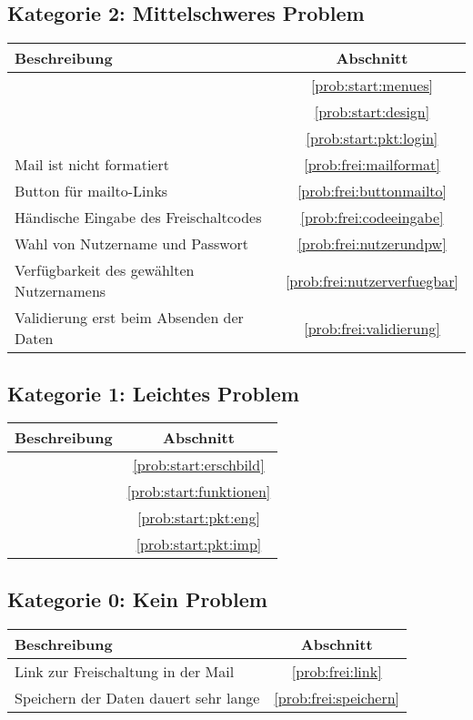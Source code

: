 \subsection*{Kategorie 2: Mittelschweres Problem}
\begin{tabular}{|p{12cm}|c|}
\hline
\textbf{Beschreibung} & \textbf{Abschnitt} \\
\hline\hline
\nameref{prob:start:menues} & \ref{prob:start:menues} \\
\nameref{prob:start:design} & \ref{prob:start:design} \\
\nameref{prob:start:pkt:login} & \ref{prob:start:pkt:login}\\
Mail ist nicht formatiert & \ref{prob:frei:mailformat}\\
Button für mailto-Links & \ref{prob:frei:buttonmailto}\\
Händische Eingabe des Freischaltcodes & \ref{prob:frei:codeeingabe}\\
Wahl von Nutzername und Passwort & \ref{prob:frei:nutzerundpw}\\
Verfügbarkeit des gewählten Nutzernamens & \ref{prob:frei:nutzerverfuegbar}\\
Validierung erst beim Absenden der Daten & \ref{prob:frei:validierung}\\
\hline

\end{tabular}

\subsection*{Kategorie 1: Leichtes Problem}
\begin{tabular}{|p{12cm}|c|}
\hline
\textbf{Beschreibung} & \textbf{Abschnitt} \\
\hline\hline
\nameref{prob:start:erschbild} & \ref{prob:start:erschbild}\\
\nameref{prob:start:funktionen} & \ref{prob:start:funktionen}\\
\nameref{prob:start:pkt:eng} & \ref{prob:start:pkt:eng}\\
\nameref{prob:start:pkt:imp} & \ref{prob:start:pkt:imp}\\
\hline
\end{tabular}

\subsection*{Kategorie 0: Kein Problem}
\begin{tabular}{|p{12cm}|c|}
\hline
\textbf{Beschreibung} & \textbf{Abschnitt} \\
\hline\hline
Link zur Freischaltung in der Mail & \ref{prob:frei:link}\\
Speichern der Daten dauert sehr lange & \ref{prob:frei:speichern}\\
\hline
\end{tabular}
